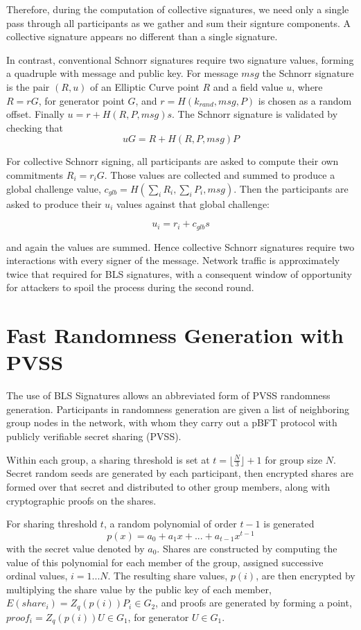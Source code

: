 \documentclass[article,oneside]{memoir}
\begin{document}
Therefore, during the computation of collective signatures, we need only a single pass through all participants as we gather and sum their signture components. A collective signature appears no different than a single signature.

In contrast, conventional Schnorr signatures require two signature values, forming a quadruple with message and public key. For message $msg$ the Schnorr signature is the pair $(R,u)$ of an Elliptic Curve point $R$ and a field value $u$, where $R = r G$, for generator point $G$, and $r = H(k_{rand}, msg, P)$ is chosen as a random offset. Finally $u = r + H(R,P,msg) s$. The Schnorr signature is validated by checking that $$u G = R + H(R, P, msg) P$$

For collective Schnorr signing, all participants are asked to compute their own commitments $R_i = r_i G$. Those values are collected and summed to produce a global challenge value, $c_{glb} = H(\sum_i R_i, \sum_i P_i, msg)$.  Then the participants are asked to produce their $u_i$ values against that global challenge:

$$u_i = r_i + c_{glb} s$$

and again the values are summed. Hence collective Schnorr signatures require two interactions with every signer of the message. Network traffic is approximately twice that required for BLS signatures, with a consequent window of opportunity for attackers to spoil the process during the second round.

\chapter{Fast Randomness Generation with PVSS}

The use of BLS Signatures allows an abbreviated form of PVSS randomness generation. Participants in randomness generation are given a list of neighboring group nodes in the network, with whom they carry out a pBFT protocol with publicly verifiable secret sharing (PVSS). 

Within each group, a sharing threshold is set at $t = \lfloor \frac{N}{3} \rfloor + 1$ for group size $N$. Secret random seeds are generated by each participant, then encrypted shares are formed over that secret and distributed to other group members, along with cryptographic proofs on the shares.

For sharing threshold $t$, a random polynomial of order $t-1$ is generated $$p(x) = a_0 + a_1 x + ... + a_{t-1} x^{t-1}$$ with the secret value denoted by $a_0$.  Shares are constructed by computing the value of this polynomial for each member of the group, assigned successive ordinal values, $i = 1 ... N$. The resulting share values, $p(i)$, are then encrypted by multiplying the share value by the public key of each member, $E(share_i) = Z_q(p(i)) P_i \in G_2$, and proofs are generated by forming a point, $proof_i = Z_q(p(i)) U \in G_1$, for generator $U \in G_1$. 
\end{document}
